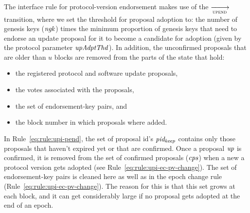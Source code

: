 \clearpage

The interface rule for protocol-version endorsement makes use of the
$\trans{upend}{}$ transition, where we set the threshold for proposal adoption
to: the number of genesis keys ($\mathit{ngk}$) times the minimum proportion of
genesis keys that need to endorse an update proposal for it to become a
candidate for adoption (given by the protocol parameter $\mathit{upAdptThd}$). In
addition, the unconfirmed proposals that are older than $u$ blocks are removed
from the parts of the state that hold:
\begin{itemize}
\item the registered protocol and software update proposals,
\item the votes associated with the proposals,
\item the set of endorsement-key pairs, and
\item the block number in which proposals where added.
\end{itemize}

In Rule~\ref{eq:rule:upi-pend}, the set of proposal id's $\mathit{pid_{keep}}$
contains only those proposals that haven't expired yet or that are confirmed.
Once a proposal $\mathit{up}$ is confirmed, it is removed from the set of
confirmed proposals ($\mathit{cps}$) when a new a protocol version gets adopted
(see Rule~\ref{eq:rule:upi-ec-pv-change}).
%
The set of endorsement-key pairs is cleaned here as well as in the epoch change
rule (Rule~\ref{eq:rule:upi-ec-pv-change}). The reason for this is that this set grows at
each block, and it can get considerably large if no proposal gets adopted at
the end of an epoch.

